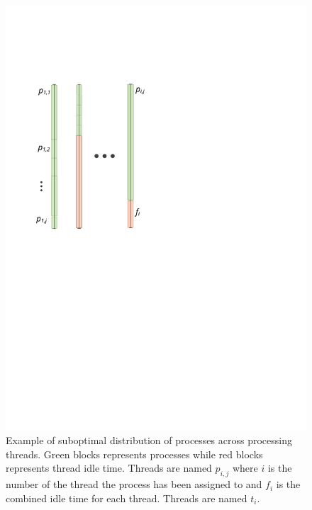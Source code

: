 \begin{figure}
\centering
\includegraphics{figures/parallel}
\caption[Proposed SME parallelization model]{Example of suboptimal
  distribution of processes across processing threads. Green blocks
  represents processes while red blocks represents thread idle
  time. Threads are named $p_{i,j}$ where $i$ is the number of the
  thread the process has been assigned to and $f_i$ is the combined
  idle time for each thread. Threads are named $t_i$.}

\label{fig:suboptdist}

\end{figure}





